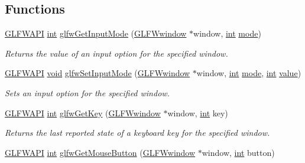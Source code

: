 \subsection*{Functions}
\begin{DoxyCompactItemize}
\item 
\hyperlink{glfw3_8h_a56da5036b2cc259351ae22fd6439bb47}{G\+L\+F\+W\+A\+P\+I} \hyperlink{wglew_8h_a500a82aecba06f4550f6849b8099ca21}{int} \hyperlink{group__input_ga1248dd5b1e566b2817e71547564d6af9}{glfw\+Get\+Input\+Mode} (\hyperlink{group__window_ga3c96d80d363e67d13a41b5d1821f3242}{G\+L\+F\+Wwindow} $\ast$window, \hyperlink{wglew_8h_a500a82aecba06f4550f6849b8099ca21}{int} \hyperlink{glew_8h_a1e71d9c196e4683cc06c4b54d53f7ef5}{mode})
\begin{DoxyCompactList}\small\item\em Returns the value of an input option for the specified window. \end{DoxyCompactList}\item 
\hyperlink{glfw3_8h_a56da5036b2cc259351ae22fd6439bb47}{G\+L\+F\+W\+A\+P\+I} \hyperlink{wglew_8h_aeea6e3dfae3acf232096f57d2d57f084}{void} \hyperlink{group__input_gae1eb729d2dd91dc33fd60e150a6e1684}{glfw\+Set\+Input\+Mode} (\hyperlink{group__window_ga3c96d80d363e67d13a41b5d1821f3242}{G\+L\+F\+Wwindow} $\ast$window, \hyperlink{wglew_8h_a500a82aecba06f4550f6849b8099ca21}{int} \hyperlink{glew_8h_a1e71d9c196e4683cc06c4b54d53f7ef5}{mode}, \hyperlink{wglew_8h_a500a82aecba06f4550f6849b8099ca21}{int} \hyperlink{glew_8h_a6a4f8a1a444e9080b297963b3db29fe0}{value})
\begin{DoxyCompactList}\small\item\em Sets an input option for the specified window. \end{DoxyCompactList}\item 
\hyperlink{glfw3_8h_a56da5036b2cc259351ae22fd6439bb47}{G\+L\+F\+W\+A\+P\+I} \hyperlink{wglew_8h_a500a82aecba06f4550f6849b8099ca21}{int} \hyperlink{group__input_ga7d8ad8ffaf272808f04e1d5d33ec8859}{glfw\+Get\+Key} (\hyperlink{group__window_ga3c96d80d363e67d13a41b5d1821f3242}{G\+L\+F\+Wwindow} $\ast$window, \hyperlink{wglew_8h_a500a82aecba06f4550f6849b8099ca21}{int} key)
\begin{DoxyCompactList}\small\item\em Returns the last reported state of a keyboard key for the specified window. \end{DoxyCompactList}\item 
\hyperlink{glfw3_8h_a56da5036b2cc259351ae22fd6439bb47}{G\+L\+F\+W\+A\+P\+I} \hyperlink{wglew_8h_a500a82aecba06f4550f6849b8099ca21}{int} \hyperlink{group__input_ga6da5efb04f700c312a57a169fa9393a0}{glfw\+Get\+Mouse\+Button} (\hyperlink{group__window_ga3c96d80d363e67d13a41b5d1821f3242}{G\+L\+F\+Wwindow} $\ast$window, \hyperlink{wglew_8h_a500a82aecba06f4550f6849b8099ca21}{int} button)

\end{DoxyCompactItemize}
